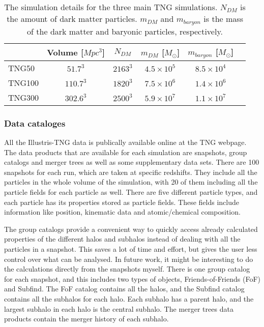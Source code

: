 \begin{table}
\begin{center}
\begin{tabular}{ l| c c c c c } 
 \hline
 \hline
   &  Volume [$Mpc^3$] & $N_{DM}$ & $m_{DM}$ [$M_{\odot}$] & $m_{baryon}$ [$M_{\odot}$] \\
 \hline
 TNG50 & $51.7^3$ & $2163^3$ & $4.5 \times 10^5 $ & $8.5 \times 10^4 $ \\ 
 TNG100 & $110.7^3$ & $1820^3$ & $7.5 \times 10^6 $ & $1.4 \times 10^6 $  \\ 
 TNG300 & $302.6^3$ & $2500^3$ & $5.9 \times 10^7 $ & $1.1 \times 10^7 $  \\ 
 \hline 
 \end{tabular}
\end{center}
\caption{The simulation details for the three main TNG simulations. $N_{DM}$ is the amount of dark matter particles. $m_{DM}$ and $m_{baryon}$ is the mass of the dark matter and baryonic particles, respectively.}
 \label{TNG}
\end{table}

\subsubsection{Data cataloges}
All the Illustris-TNG data is publically available online at the TNG webpage. The data products that are available for each simulation are snapshots, group catalogs and merger trees as well as some supplementary data sets. There are 100 snapshots for each run, which are taken at specific redshifts. They include all the particles in the whole volume of the simulation, with 20 of them including all the particle fields for each particle as well. There are five different particle types, and each particle has its properties stored as particle fields. These fields include information like position, kinematic data and atomic/chemical composition. 


The group catalogs provide a convenient way to quickly access already calculated properties of the different halos and subhalos instead of dealing with all the particles in a snapshot. This saves a lot of time and effort, but gives the user less control over what can be analysed. In future work, it might be interesting to do the calculations directly from the snapshots myself. There is one group catalog for each snapshot, and this includes two types of objects, Friends-of-Friends (FoF) and Subfind. The FoF catalog contains all the halos, and the Subfind catalog contains all the subhalos for each halo. Each subhalo has a parent halo, and the largest subhalo in each halo is the central subhalo. The merger trees data products contain the merger history of each subhalo.

